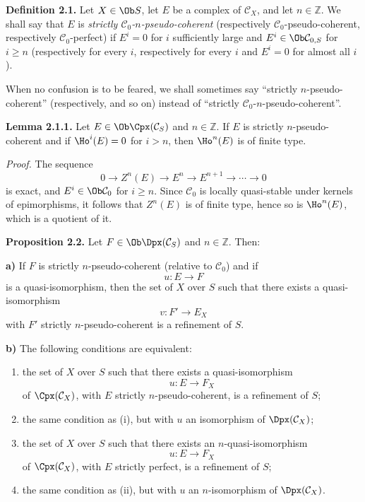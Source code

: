 \textbf{Definition 2.1.} Let \(X\in\Ob S\), let \(E\) be a complex of \(\mathcal C_X\), and let \(n\in\mathbb Z\). We shall say that \(E\) is \emph{strictly \(\mathcal C_0\)-\(n\)-pseudo-coherent} (respectively \(\mathcal C_0\)-pseudo-coherent, respectively \(\mathcal C_0\)-perfect) if \(E^i=0\) for \(i\) sufficiently large and \(E^i\in\Ob\mathcal C_{0,S}\) for \(i\geq n\) (respectively for every \(i\), respectively for every \(i\) and \(E^i=0\) for almost all \(i\)).

When no confusion is to be feared, we shall sometimes say ``strictly \(n\)-pseudo-coherent'' (respectively, and so on) instead of ``strictly \(\mathcal C_0\)-\(n\)-pseudo-coherent''.

\textbf{Lemma 2.1.1.} Let \(E\in\Ob\Cpx(\mathcal C_S)\) and \(n\in\mathbb Z\). If \(E\) is strictly \(n\)-pseudo-coherent and if \(\Ho^i(E)=0\) for \(i>n\), then \(\Ho^n(E)\) is of finite type.

\emph{Proof.} The sequence
\[
  0\longrightarrow Z^n(E)\longrightarrow E^n\longrightarrow E^{n+1}\longrightarrow\cdots\longrightarrow 0
\]
is exact, and \(E^i\in\Ob\mathcal C_0\) for \(i\geq n\). Since \(\mathcal C_0\) is locally quasi-stable under kernels of epimorphisms, it follows that \(Z^n(E)\) is of finite type, hence so is \(\Ho^n(E)\), which is a quotient of it.

\textbf{Proposition 2.2.} Let \(F\in\Ob\Dpx(\mathcal C_S)\) and \(n\in\mathbb Z\). Then:

\textbf{a)} If \(F\) is strictly \(n\)-pseudo-coherent (relative to \(\mathcal C_0\)) and if
\[
  u:E\longrightarrow F
\]
is a quasi-isomorphism, then the set of \(X\) over \(S\) such that there exists a quasi-isomorphism
\[
  v:F'\longrightarrow E_X
\]
with \(F'\) strictly \(n\)-pseudo-coherent is a refinement of \(S\).

\textbf{b)} The following conditions are equivalent:
\begin{enumerate}[label=(\roman*)]
\item the set of \(X\) over \(S\) such that there exists a quasi-isomorphism
\[
  u:E\longrightarrow F_X
\]
of \(\Cpx(\mathcal C_X)\), with \(E\) strictly \(n\)-pseudo-coherent, is a refinement of \(S\);
\item[\((\mathrm{i}')\)] the same condition as (i), but with \(u\) an isomorphism of \(\Dpx(\mathcal C_X)\);
\item the set of \(X\) over \(S\) such that there exists an \(n\)-quasi-isomorphism
\[
  u:E\longrightarrow F_X
\]
of \(\Cpx(\mathcal C_X)\), with \(E\) strictly perfect, is a refinement of \(S\);
\item[\((\mathrm{ii}')\)] the same condition as (ii), but with \(u\) an \(n\)-isomorphism of \(\Dpx(\mathcal C_X)\).
\end{enumerate}

